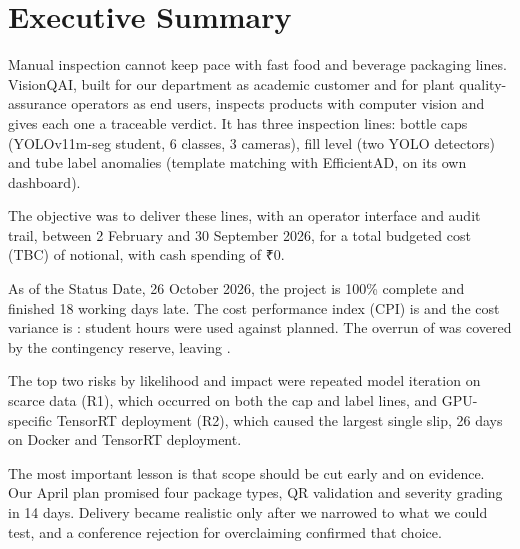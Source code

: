 \clearpage
\section{Executive Summary}
Manual inspection cannot keep pace with fast food and beverage packaging lines. VisionQAI, built for our department as academic customer and for plant quality-assurance operators as end users, inspects products with computer vision and gives each one a traceable verdict. It has three inspection lines: bottle caps (YOLOv11m-seg student, 6 classes, 3 cameras), fill level (two YOLO detectors) and tube label anomalies (template matching with EfficientAD, on its own dashboard).

The objective was to deliver these lines, with an operator interface and audit trail, between 2 February and 30 September 2026, for a total budgeted cost (TBC) of \vTBC{} notional, with cash spending of ₹0.

As of the Status Date, 26 October 2026, the project is 100\% complete and finished 18 working days late. The cost performance index (CPI) is \vCPI{} and the cost variance is \vCV{}: \vStudentHoursActual{} student hours were used against \vStudentHoursPlan{} planned. The overrun of \vOverrunAbs{} was covered by the \vRESERVE{} contingency reserve, leaving \vReserveLeft{}.

The top two risks by likelihood and impact were repeated model iteration on scarce data (R1), which occurred on both the cap and label lines, and GPU-specific TensorRT deployment (R2), which caused the largest single slip, 26 days on Docker and TensorRT deployment.

The most important lesson is that scope should be cut early and on evidence. Our April plan promised four package types, QR validation and severity grading in 14 days. Delivery became realistic only after we narrowed to what we could test, and a conference rejection for overclaiming confirmed that choice.
